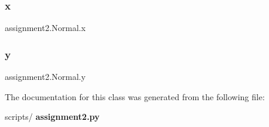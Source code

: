 \mbox{\label{classassignment2_1_1_normal_a4c1784506528b3a3cd59f91d5e99dc8e}} 
\subsubsection{x}
{\footnotesize\ttfamily assignment2.\+Normal.\+x\hspace{0.3cm}{\ttfamily [static]}}

\mbox{\label{classassignment2_1_1_normal_a1e84591bcc008cc1676995bc9bf15004}} 
\subsubsection{y}
{\footnotesize\ttfamily assignment2.\+Normal.\+y\hspace{0.3cm}{\ttfamily [static]}}



The documentation for this class was generated from the following file\+:\begin{DoxyCompactItemize}
\item 
scripts/\textbf{ assignment2.\+py}\end{DoxyCompactItemize}
